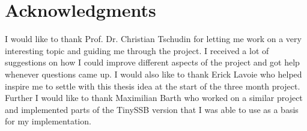 \chapter{Acknowledgments}
I would like to thank Prof. Dr. Christian Tschudin for letting me work on a very interesting topic and guiding me through the project. I received a lot of suggestions on how I could improve different aspects of the project and got help whenever questions came up. I would also like to thank Erick Lavoie who helped inspire me to settle with this thesis idea at the start of the three month project. Further I would like to thank Maximilian Barth who worked on a similar project and implemented parts of the TinySSB version that I was able to use as a basis for my implementation.